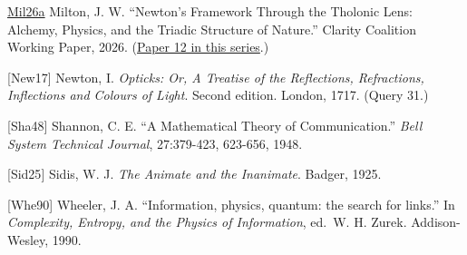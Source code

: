 \documentclass[12pt]{article}
\begin{document}
\href{https://github.com/baardev/truevalue/blob/main/docnav/Research/papers/12_newton-tholonic-framework/12_newton-tholonic-framework.pdf}{Mil26a}
Milton, J. W. ``Newton's Framework Through the Tholonic Lens: Alchemy,
Physics, and the Triadic Structure of Nature.'' Clarity Coalition
Working Paper, 2026.
(\href{https://github.com/baardev/truevalue/blob/main/docnav/Research/papers/12_newton-tholonic-framework/12_newton-tholonic-framework.pdf}{Paper
12 in this series}.)

{[}New17{]} Newton, I. \emph{Opticks: Or, A Treatise of the Reflections,
Refractions, Inflections and Colours of Light}. Second edition. London,
1717. (Query 31.)

{[}Sha48{]} Shannon, C. E. ``A Mathematical Theory of Communication.''
\emph{Bell System Technical Journal}, 27:379-423, 623-656, 1948.

{[}Sid25{]} Sidis, W. J. \emph{The Animate and the Inanimate}. Badger,
1925.

{[}Whe90{]} Wheeler, J. A. ``Information, physics, quantum: the search
for links.'' In \emph{Complexity, Entropy, and the Physics of
Information}, ed.~W. H. Zurek. Addison-Wesley, 1990.
\end{document}
